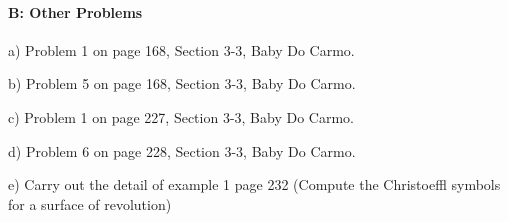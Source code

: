 \documentclass[12pt]{article}
\begin{document}
\paragraph{B: Other Problems}
\begin{itemize}

{\item a) Problem 1 on page 168,  Section 3-3, Baby Do Carmo.}
{\item b) Problem 5 on page 168,  Section 3-3, Baby Do Carmo.}
{\item c) Problem 1 on page 227,  Section 3-3, Baby Do Carmo.}
{\item d) Problem 6 on page 228,  Section 3-3, Baby Do Carmo.}
{\item e) Carry out the detail of example 1 page 232 (Compute the Christoeffl symbols for a surface of revolution)}

\end{itemize}

\end{document}
